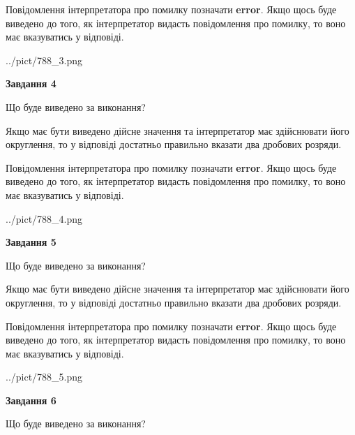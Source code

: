 \documentclass[12pt, ukrainian]{article}
\begin{document}
{\begin {Large}
Повідомлення інтерпретатора про помилку позначати \textbf{error}.
Якщо щось буде виведено до того, як інтерпретатор видасть повідомлення про помилку, 
то воно має вказуватись у відповіді. \par

\begin{center}
	{../pict/788_3.png}
\end{center}
\newpage

{\begin {center}\textbf{Завдання 4}\end {center}}\par
Що буде виведено за виконання? \par

Якщо має бути виведено дійсне значення та інтерпретатор має здійснювати його округлення, 
то у відповіді достатньо правильно вказати два дробових розряди.

Повідомлення інтерпретатора про помилку позначати \textbf{error}.
Якщо щось буде виведено до того, як інтерпретатор видасть повідомлення про помилку, 
то воно має вказуватись у відповіді. \par

\begin{center}
	{../pict/788_4.png}
\end{center}
\newpage

{\begin {center}\textbf{Завдання 5}\end {center}}\par
Що буде виведено за виконання? \par

Якщо має бути виведено дійсне значення та інтерпретатор має здійснювати його округлення, 
то у відповіді достатньо правильно вказати два дробових розряди.

Повідомлення інтерпретатора про помилку позначати \textbf{error}.
Якщо щось буде виведено до того, як інтерпретатор видасть повідомлення про помилку, 
то воно має вказуватись у відповіді. \par

\begin{center}
	{../pict/788_5.png}
\end{center}
\newpage

{\begin {center}\textbf{Завдання 6}\end {center}}\par
Що буде виведено за виконання? \par


\end{Large}}
\end{document}
